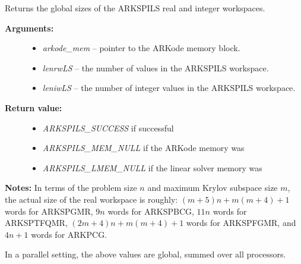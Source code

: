 \documentclass[letterpaper,10pt,english]{sphinxmanual}
\begin{document}
\begin{fulllineitems}
\label{c_interface/User_callable:c.ARKSpilsGetWorkSpace}
Returns the global sizes of the ARKSPILS real and integer workspaces.
\begin{description}
\item[{\textbf{Arguments:}}] \leavevmode\begin{itemize}
\item {} 
\emph{arkode\_mem} -- pointer to the ARKode memory block.

\item {} 
\emph{lenrwLS} -- the number of  values in the ARKSPILS workspace.

\item {} 
\emph{leniwLS} -- the number of integer values in the ARKSPILS workspace.

\end{itemize}

\item[{\textbf{Return value:}}] \leavevmode\begin{itemize}
\item {} 
\emph{ARKSPILS\_SUCCESS} if successful

\item {} 
\emph{ARKSPILS\_MEM\_NULL} if the ARKode memory was 

\item {} 
\emph{ARKSPILS\_LMEM\_NULL} if the linear solver memory was 

\end{itemize}

\end{description}

\textbf{Notes:} In terms of the problem size \(n\) and maximum Krylov subspace
size \(m\), the actual size of the real workspace is roughly:
\((m+5)n+m(m+4)+1\)  words for ARKSPGMR,
\(9n\)  words for ARKSPBCG, \(11n\)
 words for ARKSPTFQMR, \((2m+4)n+m(m+4)+1\)
 words for ARKSPFGMR, and \(4n+1\)
 words for ARKPCG.

In a parallel setting, the above values are global, summed over all
processors.

\end{fulllineitems}

\end{document}
